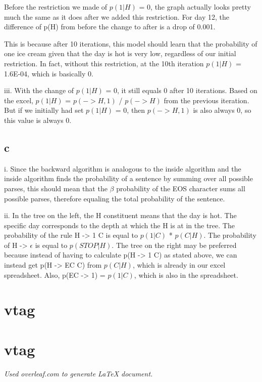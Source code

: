 \documentclass[12pt, letterpaper]{article}
\begin{document}
Before the restriction we made of $p(1 | H)$ = 0, the graph actually looks pretty much the same as it does after we added this restriction. For day 12, the difference of p(H) from before the change to after is a drop of 0.001.

This is because after 10 iterations, this model should learn that the probability of one ice cream given that the day is hot is very low, regardless of our initial restriction. In fact, without this restriction, at the 10th iteration $p(1 | H)$ = 1.6E-04, which is basically 0.

iii. With the change of $p(1|H)$ = 0, it still equals 0 after 10 iterations. Based on the excel, $p(1|H)$ = $p(->H, 1)$ / $p(->H)$ from the previous iteration. But if we initially had set $p(1|H)$ = 0, then $p(->H, 1)$ is also always 0, so this value is always 0.

\subsection{c}

i. Since the backward algorithm is analogous to the inside algorithm and the inside algorithm finds the probability of a sentence by summing over all possible parses, this should mean that the $\beta$ probability of the EOS character sums all possible parses, therefore equaling the total probability of the sentence.

ii. In the tree on the left, the H constituent means that the day is hot. The specific day corresponds to the depth at which the H is at in the tree.
The probability of the rule H -> 1 C is equal to $p(1 | C)$ * $p(C | H)$. 
The probability of H -> $\epsilon$ is equal to $p(STOP | H)$. 
The tree on the right may be preferred because instead of having to calculate p(H -> 1 C) as stated above, we can instead get p(H -> EC C) from $p(C | H)$, which is already in our excel spreadsheet. Also, p(EC -> 1) = $p(1 | C)$, which is also in the spreadsheet.

\section{vtag}

\section{vtag}



\begin{center}
\textit{Used overleaf.com to generate LaTeX document.}
\end{center}
\end{document}
